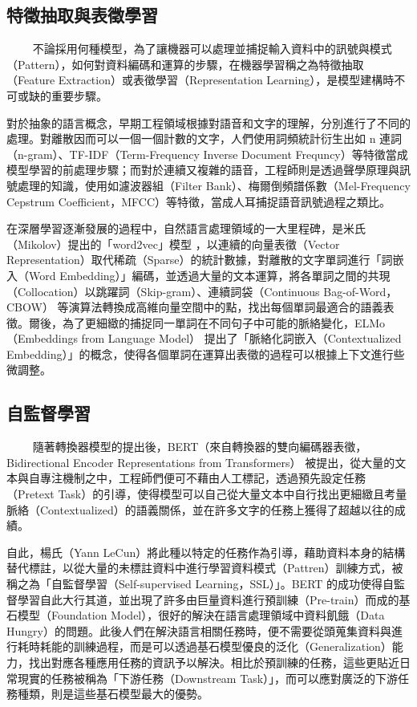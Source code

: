\subsection{特徵抽取與表徵學習 }
　　
不論採用何種模型，為了讓機器可以處理並捕捉輸入資料中的訊號與模式（Pattern），如何對資料編碼和運算的步驟，在機器學習稱之為特徵抽取（Feature Extraction）或表徵學習（Representation Learning），是模型建構時不可或缺的重要步驟。

對於抽象的語言概念，早期工程領域根據對語音和文字的理解，分別進行了不同的處理。對離散因而可以一個一個計數的文字，人們使用詞頻統計衍生出如 n 連詞（n-gram）、TF-IDF（Term-Frequency Inverse Document Frequncy）等特徵當成模型學習的前處理步驟；而對於連續又複雜的語音，工程師則是透過聲學原理與訊號處理的知識，使用如濾波器組（Filter Bank）、梅爾倒頻譜係數（Mel-Frequency Cepstrum Coefficient，MFCC）等特徵，當成人耳捕捉語音訊號過程之類比。

在深層學習逐漸發展的過程中，自然語言處理領域的一大里程碑，是米氏（Mikolov）提出的「word2vec」模型 \cite{mikolov_efficient_2013}，以連續的向量表徵（Vector Representation）取代稀疏（Sparse）的統計數據，對離散的文字單詞進行「詞嵌入（Word Embedding）」編碼，並透過大量的文本運算，將各單詞之間的共現（Collocation）以跳躍詞（Skip-gram）、連續詞袋（Continuous Bag-of-Word，CBOW） 等演算法轉換成高維向量空間中的點，找出每個單詞最適合的語義表徵。爾後，為了更細緻的捕捉同一單詞在不同句子中可能的脈絡變化，ELMo（Embeddings from Language Model）\cite{peters_deep_2018} 提出了「脈絡化詞嵌入（Contextualized Embedding）」的概念，使得各個單詞在運算出表徵的過程可以根據上下文進行些微調整。

\subsection{自監督學習}
　　
隨著轉換器模型的提出後，BERT（來自轉換器的雙向編碼器表徵，Bidirectional Encoder Representations from Transformers）\cite{devlin_bert_2019} 被提出，從大量的文本與自專注機制之中，工程師們便可不藉由人工標記，透過預先設定任務（Pretext Task）的引導，使得模型可以自己從大量文本中自行找出更細緻且考量脈絡（Contextualized）的語義關係，並在許多文字的任務上獲得了超越以往的成績。

自此，楊氏（Yann LeCun）將此種以特定的任務作為引導，藉助資料本身的結構替代標註，以從大量的未標註資料中進行學習資料模式（Pattren）訓練方式，被稱之為「自監督學習（Self-supervised Learning，SSL）」。BERT 的成功使得自監督學習自此大行其道，並出現了許多由巨量資料進行預訓練（Pre-train）而成的基石模型（Foundation Model），很好的解決在語言處理領域中資料飢餓（Data Hungry）的問題。此後人們在解決語言相關任務時，便不需要從頭蒐集資料與進行耗時耗能的訓練過程，而是可以透過基石模型優良的泛化（Generalization）能力，找出對應各種應用任務的資訊予以解決。相比於預訓練的任務，這些更貼近日常現實的任務被稱為「下游任務（Downstream Task）」，而可以應對廣泛的下游任務種類，則是這些基石模型最大的優勢。

